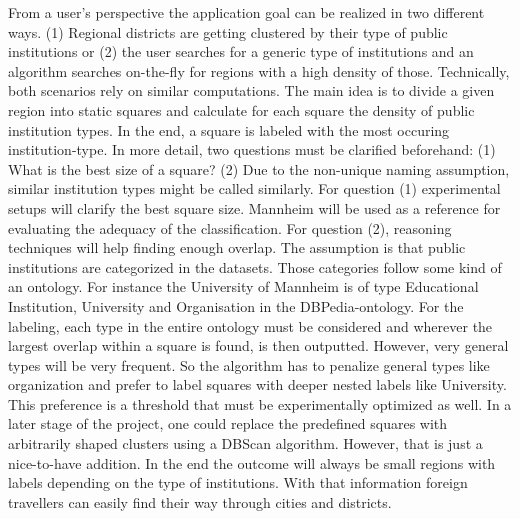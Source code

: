 From a user's perspective the application goal can be realized in two different ways. (1) Regional districts are getting clustered by their type of public institutions or (2) the user searches for a generic type of institutions and an algorithm searches on-the-fly for regions with a high density of those. Technically, both scenarios rely on similar computations. The main idea is to divide a given region into static squares and calculate for each square the density of public institution types. In the end, a square is labeled with the most occuring institution-type. In more detail, two questions must be clarified beforehand: (1) What is the best size of a square? (2) Due to the non-unique naming assumption, similar institution types might be called similarly. For question (1) experimental setups will clarify the best square size. Mannheim will be used as a reference for evaluating the adequacy of the classification. For question (2), reasoning techniques will help finding enough overlap. The assumption is that public institutions are categorized in the datasets. Those categories follow some kind of an ontology. For instance the University of Mannheim is of type \flqq{}Educational Institution\frqq{}, \flqq{}University\frqq{} and \flqq{}Organisation\frqq{} in the DBPedia-ontology. For the labeling, each type in the entire ontology must be considered and wherever the largest overlap within a square is found, is then outputted. However, very general types will be very frequent. So the algorithm has to penalize general types like organization and prefer to label squares with deeper nested labels like \flqq{}University\frqq{}. This preference is a threshold that must be experimentally optimized as well. In a later stage of the project, one could replace the predefined squares with arbitrarily shaped clusters using a DBScan algorithm. However, that is just a nice-to-have addition. In the end the outcome will always be small regions with labels depending on the type of institutions. With that information foreign travellers can easily find their way through cities and districts. 

